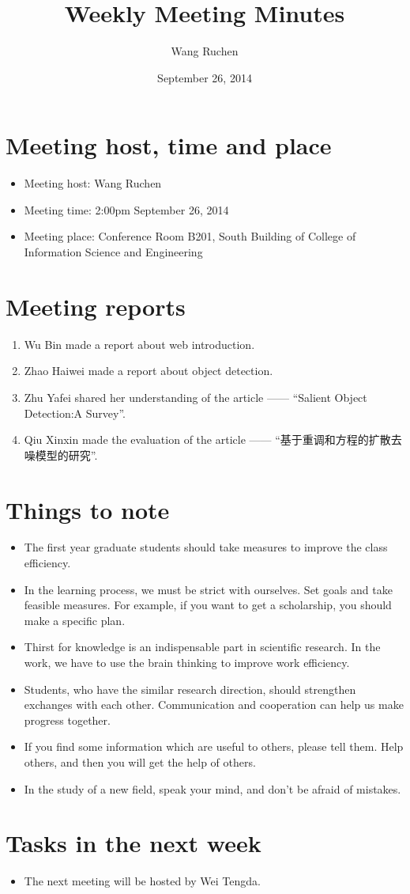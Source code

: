 \documentclass[a4paper，12pt]{article}
\title{Weekly Meeting Minutes}
\author{Wang Ruchen}
\date{September 26, 2014}
\begin{document}
\maketitle

\section{Meeting host, time and place}

\begin{itemize}
\item Meeting host: Wang Ruchen
\item Meeting time: 2:00pm September 26, 2014 
\item Meeting place: Conference Room B201, South Building of College of Information Science and Engineering 
\end{itemize}

\section{Meeting reports}

\begin{enumerate}
\item Wu Bin made a report about web introduction. 
\item Zhao Haiwei made a report about object detection.
\item Zhu Yafei shared her understanding of the article —— ``Salient Object Detection:A Survey''.
\item Qiu Xinxin made the evaluation of the article —— ``基于重调和方程的扩散去噪模型的研究''.
\end{enumerate}

\section {Things to note}

\begin{itemize}
\item The first year graduate students should take measures to improve the class efficiency.
\item In the learning process, we must be strict with ourselves. Set goals and take feasible measures. For example, if you want to get a scholarship, you should make a specific plan.
\item Thirst for knowledge is an indispensable part in scientific research. In the work, we have to use the brain thinking to improve work efficiency.
\item Students, who have the similar research direction, should strengthen exchanges with each other. Communication and cooperation can help us make progress together.
\item If you find some information which are useful to others, please tell them. Help others, and then you will get the help of others.
\item In the study of a new field, speak your mind, and don't be afraid of mistakes.
\end{itemize}

\section {Tasks in the next week }

\begin{itemize}
\item The next meeting will be hosted by Wei Tengda.
\end{itemize}
\end{document}
